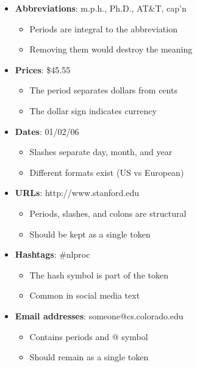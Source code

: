 \documentclass[11pt,a4paper]{article}
\theoremstyle{definition}
\theoremstyle{plain}
\theoremstyle{remark}
\begin{document}
\begin{itemize}
    \item \textbf{Abbreviations}: m.p.h., Ph.D., AT\&T, cap'n
    \begin{itemize}
        \item Periods are integral to the abbreviation
        \item Removing them would destroy the meaning
    \end{itemize}
    
    \item \textbf{Prices}: \$45.55
    \begin{itemize}
        \item The period separates dollars from cents
        \item The dollar sign indicates currency
    \end{itemize}
    
    \item \textbf{Dates}: 01/02/06
    \begin{itemize}
        \item Slashes separate day, month, and year
        \item Different formats exist (US vs European)
    \end{itemize}
    
    \item \textbf{URLs}: http://www.stanford.edu
    \begin{itemize}
        \item Periods, slashes, and colons are structural
        \item Should be kept as a single token
    \end{itemize}
    
    \item \textbf{Hashtags}: \#nlproc
    \begin{itemize}
        \item The hash symbol is part of the token
        \item Common in social media text
    \end{itemize}
    
    \item \textbf{Email addresses}: someone@cs.colorado.edu
    \begin{itemize}
        \item Contains periods and @ symbol
        \item Should remain as a single token
    \end{itemize}
\end{itemize}
\end{document}
